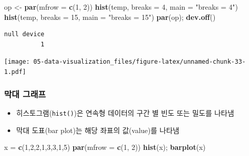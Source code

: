 \documentclass[
  11pt,
]{krantz}
\newenvironment{Shaded}{\begin{snugshade}}{\end{snugshade}}
\newcommand{\DataTypeTok}[1]{\textcolor[rgb]{0.27,0.27,0.27}{#1}}
\newcommand{\DecValTok}[1]{\textcolor[rgb]{0.06,0.06,0.06}{#1}}
\newcommand{\KeywordTok}[1]{\textcolor[rgb]{0.27,0.27,0.27}{\textbf{#1}}}
\newcommand{\NormalTok}[1]{#1}
\newcommand{\StringTok}[1]{\textcolor[rgb]{0.5,0.5,0.5}{#1}}
\providecommand{\tightlist}{%
  \setlength{\itemsep}{0pt}\setlength{\parskip}{0pt}}
\begin{document}
\footnotesize

\begin{Shaded}
\begin{Highlighting}[]
\NormalTok{op <-}\StringTok{ }\KeywordTok{par}\NormalTok{(}\DataTypeTok{mfrow =} \KeywordTok{c}\NormalTok{(}\DecValTok{1}\NormalTok{, }\DecValTok{2}\NormalTok{))}
\KeywordTok{hist}\NormalTok{(temp, }\DataTypeTok{breaks =} \DecValTok{4}\NormalTok{, }\DataTypeTok{main =} \StringTok{"breaks = 4"}\NormalTok{)}
\KeywordTok{hist}\NormalTok{(temp, }\DataTypeTok{breaks =} \DecValTok{15}\NormalTok{, }\DataTypeTok{main =} \StringTok{"breaks = 15"}\NormalTok{)}
\KeywordTok{par}\NormalTok{(op); }\KeywordTok{dev.off}\NormalTok{()}
\end{Highlighting}
\end{Shaded}

\begin{verbatim}
null device 
          1 
\end{verbatim}

\texttt{[image: 05-data-visualization\_files/figure-latex/unnamed-chunk-33-1.pdf]}

\normalsize

\hypertarget{bar-plot}{%
\subsubsection*{막대 그래프}\label{bar-plot}}


\begin{itemize}
\tightlist
\item
  히스토그램(\texttt{hist()})은 연속형 데이터의 구간 별 빈도 또는 밀도를 나타냄
\item
  막대 도표(bar plot)는 해당 좌표의 값(value)를 나타냄
\end{itemize}

\footnotesize

\begin{Shaded}
\begin{Highlighting}[]
\NormalTok{x =}\StringTok{ }\KeywordTok{c}\NormalTok{(}\DecValTok{1}\NormalTok{,}\DecValTok{2}\NormalTok{,}\DecValTok{2}\NormalTok{,}\DecValTok{1}\NormalTok{,}\DecValTok{3}\NormalTok{,}\DecValTok{3}\NormalTok{,}\DecValTok{1}\NormalTok{,}\DecValTok{5}\NormalTok{)}
\KeywordTok{par}\NormalTok{(}\DataTypeTok{mfrow =} \KeywordTok{c}\NormalTok{(}\DecValTok{1}\NormalTok{, }\DecValTok{2}\NormalTok{))}
\KeywordTok{hist}\NormalTok{(x); }\KeywordTok{barplot}\NormalTok{(x)}
\end{Highlighting}
\end{Shaded}
\end{document}
